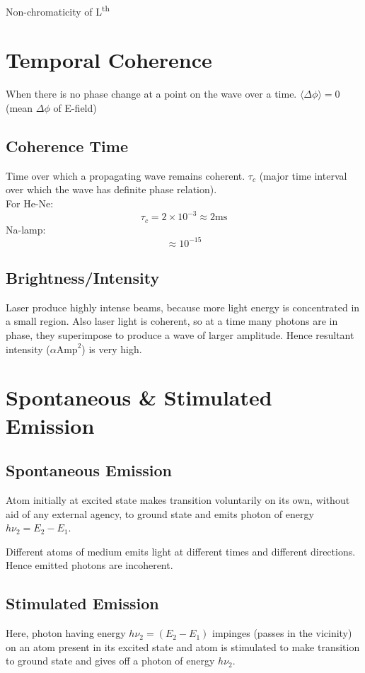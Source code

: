\documentclass{article}
\begin{document}
Non-chromaticity of L\textsuperscript{th}

\section*{Temporal Coherence}
When there is no phase change at a point on the wave over a time. \(\langle \Delta \phi \rangle = 0\) (mean \(\Delta \phi\) of E-field)

\subsection*{Coherence Time}
Time over which a propagating wave remains coherent. \(\tau_c\) (major time interval over which the wave has definite phase relation). \\
For He-Ne:
\[
\tau_c = 2 \times 10^{-3} \approx 2 \text{ms}
\]
Na-lamp:
\[
\approx 10^{-15}
\]

\subsection*{Brightness/Intensity}
Laser produce highly intense beams, because more light energy is concentrated in a small region. Also laser light is coherent, so at a time many photons are in phase, they superimpose to produce a wave of larger amplitude. Hence resultant intensity (\(\alpha \text{Amp}^2\)) is very high.

\section*{Spontaneous \& Stimulated Emission}
\subsection*{Spontaneous Emission}
Atom initially at excited state makes transition voluntarily on its own, without aid of any external agency, to ground state and emits photon of energy \(h\nu_2 = E_2 - E_1\).

Different atoms of medium emits light at different times and different directions. Hence emitted photons are incoherent.

\subsection*{Stimulated Emission}
Here, photon having energy \(h\nu_2 = (E_2 - E_1)\) impinges (passes in the vicinity) on an atom present in its excited state and atom is stimulated to make transition to ground state and gives off a photon of energy \(h\nu_2\).
\end{document}
